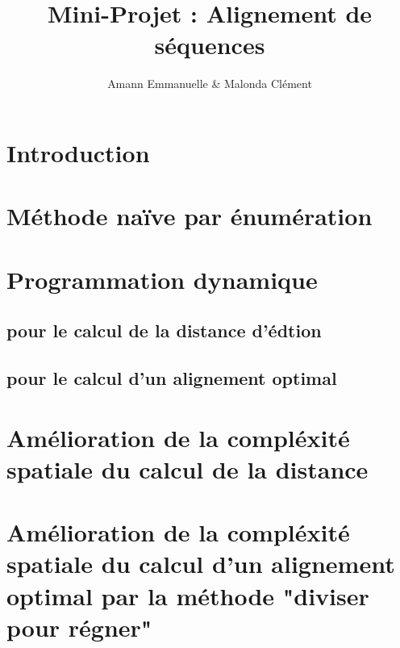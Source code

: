 \documentclass[12pt]{article}
\begin{document}
\title{Mini-Projet : Alignement de séquences}
\author{Amann Emmanuelle \& Malonda Clément}
\date{}
\maketitle
\tableofcontents
\newpage

\section{Introduction}

\section{Méthode naïve par énumération}

\section{Programmation dynamique}
\subsection{pour le calcul de la distance d'édtion}
%
\subsection{pour le calcul d'un alignement optimal}
%
\section{Amélioration de la compléxité spatiale du calcul de la distance}
%
\section{Amélioration de la compléxité spatiale du calcul d'un alignement optimal par la méthode "diviser pour régner"}
%
\end{document}
